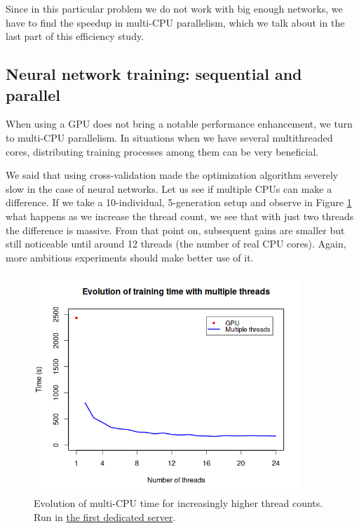 		Since in this particular problem we do not work with big enough networks, we have to find the speedup in multi-CPU parallelism, which we talk about in the last part of this efficiency study.

	\subsection{Neural network training: sequential and parallel}

		When using a GPU does not bring a notable performance enhancement, we turn to multi-CPU parallelism. In situations when we have several multithreaded cores, distributing training processes among them can be very beneficial.

		We said that using cross-validation made the optimization algorithm severely slow in the case of neural networks. Let us see if multiple CPUs can make a difference. If we take a 10-individual, 5-generation setup and observe in Figure \ref{gfx:nn_multicpu} what happens as we increase the thread count, we see that with just two threads the difference is massive. From that point on, subsequent gains are smaller but still noticeable until around 12 threads (the number of real CPU cores). Again, more ambitious experiments should make better use of it.

\newpage

		\begin{figure}[bth]

			\myfloatalign
			\includegraphics[width=0.9\textwidth]{gfx/MultiCPUvsGPU.png}
			\caption[Evolution of multi-CPU time]{Evolution of multi-CPU time for increasingly higher thread counts. Run in \hyperlink{server:firstserver}{the first dedicated server}.}\label{gfx:nn_multicpu}

		\end{figure}

